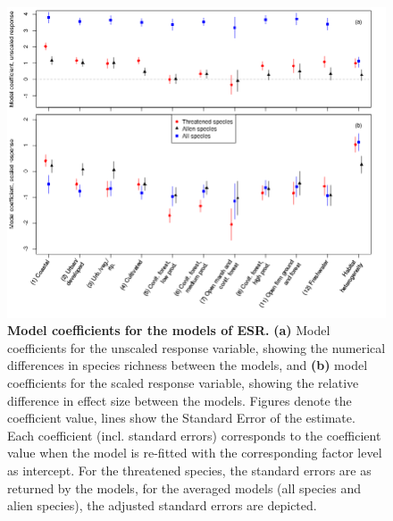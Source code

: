 \documentclass{article}
\begin{document}
\begin{figure}[h]
    \centering
    \includegraphics[width=1\textwidth]{coef.png}
    \caption{\textbf{Model coefficients for the models of ESR.} \textbf{(a)} Model coefficients for the unscaled response variable, showing the numerical differences in species richness between the models, and \textbf{(b)} model coefficients for the scaled response variable, showing the relative difference in effect size between the models. Figures denote the coefficient value, lines show the Standard Error of the estimate.\\
    Each coefficient (incl. standard errors) corresponds to the coefficient value when the model is re-fitted with the corresponding factor level as intercept. For the threatened species, the standard errors are as returned by the models, for the averaged models (all species and alien species), the adjusted standard errors are depicted. }
    \label{fig:coefficients}
\end{figure}
\end{document}

